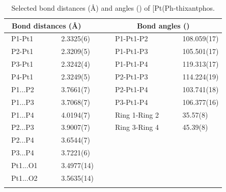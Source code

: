 \begin{table}[htp]
\caption[Selected bond distances (\AA) and angles (\degrees) of [Pt(Ph-thixantphos\ce{)2]}]{Selected bond distances (\AA) and angles (\degrees) of [Pt(Ph-thixantphos\ce{)2]}.}
\vspace{1em}
\label{table:crystalbisthixantphosplatinum:lengths}
\small
\begin{center}
\begin{tabular}{l l l l}
	\toprule
	\multicolumn{2}{l}{\bfseries{~Bond distances (\si{\angstrom})}} & \multicolumn{2}{c}{\bfseries{Bond angles (\degrees)}} \\
	\midrule		
	~P1-Pt1		~~&~~2.3325(6)~~	&~~P1-Pt1-P2		~~	&~~108.059(17)	\\
	~P2-Pt1		~~&~~2.3209(5)~~	&~~P1-Pt1-P3		~~	&~~105.501(17)	\\
	~P3-Pt1		~~&~~2.3242(4)~~	&~~P1-Pt1-P4		~~	&~~119.313(17)	\\
	~P4-Pt1		~~&~~2.3249(5)~~	&~~P2-Pt1-P3		~~	&~~114.224(19)	\\
	~P1...P2		~~&~~3.7661(7)~~	&~~P2-Pt1-P4		~~	&~~103.741(18)	\\
	~P1...P3		~~&~~3.7068(7)~~	&~~P3-Pt1-P4		~~	&~~106.377(16)	\\
	~P1...P4		~~&~~4.0194(7)~~	&~~Ring 1-Ring 2	~~	&~~35.57(8)		\\
	~P2...P3		~~&~~3.9007(7)~~	&~~Ring 3-Ring 4	~~	&~~45.39(8)		\\
	~P2...P4		~~&~~3.6544(7)~~	&~~				~~	&~~				\\
	~P3...P4		~~&~~3.7221(6)~~	&~~				~~	&~~				\\
	~Pt1...O1		~~&~~3.4977(14)~~	&~~				~~	&~~				\\
	~Pt1...O2		~~&~~3.5635(14)~~	&~~				~~	&~~				\\
	\bottomrule{}
\end{tabular}
\end{center}
\end{table}

